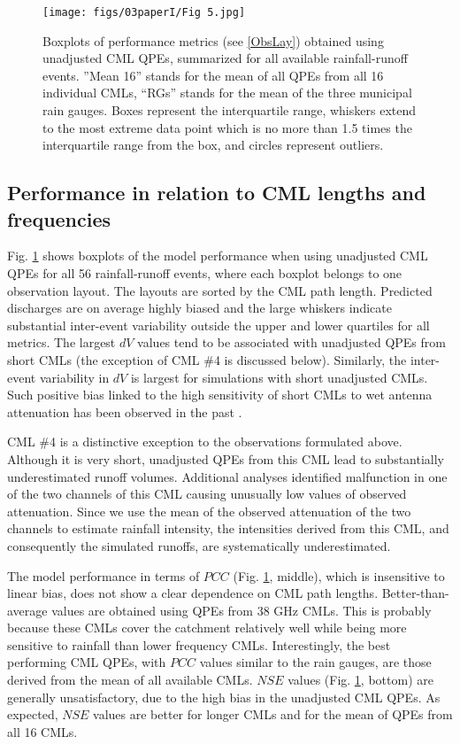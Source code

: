 \documentclass{ctuthesis}\usepackage[]{graphicx}\usepackage[]{color}
\begin{document}
\begin{figure}[h]
\begin{center}
\texttt{[image: figs/03paperI/Fig 5.jpg]}
\caption{Boxplots of performance metrics (see \ref{ObsLay}) obtained using unadjusted CML QPEs, summarized for all available rainfall-runoff events. ”Mean 16” stands for the mean of all QPEs from all 16 individual CMLs, “RGs” stands for the mean of the three municipal rain gauges. Boxes represent the interquartile range, whiskers extend to the most extreme data point which is no more than 1.5 times the interquartile range from the box, and circles represent outliers.} \label{3fig5}
\end{center}
\end{figure}


\subsection{Performance in relation to CML lengths and frequencies}

Fig. \ref{3fig5} shows boxplots of the model performance when using unadjusted CML QPEs for all 56 rainfall-runoff events, where each boxplot belongs to one observation layout. The layouts are sorted by the CML path length. Predicted discharges are on average highly biased and the large whiskers indicate substantial inter-event variability outside the upper and lower quartiles for all metrics. The largest $dV$ values tend to be associated with unadjusted QPEs from short CMLs (the exception of CML \#4 is discussed below). Similarly, the inter-event variability in $dV$ is largest for simulations with short unadjusted CMLs. Such positive bias linked to the high sensitivity of short CMLs to wet antenna attenuation has been observed in the past \citep[e.g. ][]{fenclQuantifyingWetAntenna2019}.

CML \#4 is a distinctive exception to the observations formulated above. Although it is very short, unadjusted QPEs from this CML lead to substantially underestimated runoff volumes. Additional analyses identified malfunction in one of the two channels of this CML causing unusually low values of observed attenuation. Since we use the mean of the observed attenuation of the two channels to estimate rainfall intensity, the intensities derived from this CML, and consequently the simulated runoffs, are systematically underestimated.

The model performance in terms of $PCC$ (Fig. \ref{3fig5}, middle), which is insensitive to linear bias, does not show a clear dependence on CML path lengths. Better-than-average values are obtained using QPEs from 38 GHz CMLs. This is probably because these CMLs cover the catchment relatively well while being more sensitive to rainfall than lower frequency CMLs. Interestingly, the best performing CML QPEs, with $PCC$ values similar to the rain gauges, are those derived from the mean of all available CMLs. $NSE$ values (Fig. \ref{3fig5}, bottom) are generally unsatisfactory, due to the high bias in the unadjusted CML QPEs. As expected, $NSE$ values are better for longer CMLs and for the mean of QPEs from all 16 CMLs.
 
\end{document}
